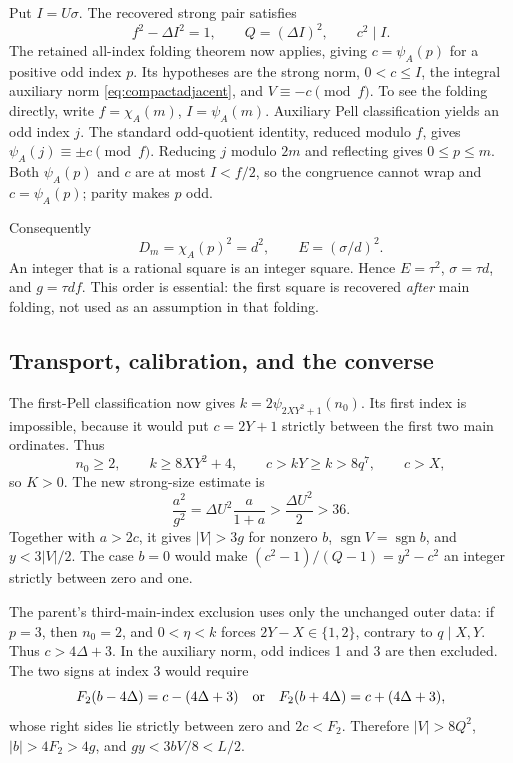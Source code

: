 Put \(I=U\sigma\). The recovered strong pair satisfies
\[
 f^2-\Delta I^2=1,\qquad Q=(\Delta I)^2,\qquad c^2\mid I.
\]
The retained all-index folding theorem now applies, giving
\(c=\psi_A(p)\) for a positive odd index \(p\). Its hypotheses are the
strong norm, \(0<c\le I\), the integral auxiliary norm
\eqref{eq:compactadjacent}, and \(V\equiv-c\pmod f\). To see the
folding directly, write \(f=\chi_A(m)\), \(I=\psi_A(m)\). Auxiliary
Pell classification yields an odd index \(j\). The standard odd-quotient
identity, reduced modulo \(f\), gives \(\psi_A(j)\equiv\pm c\pmod f\).
Reducing \(j\) modulo \(2m\) and reflecting gives \(0\le p\le m\).
Both \(\psi_A(p)\) and \(c\) are at most \(I<f/2\), so the congruence
cannot wrap and \(c=\psi_A(p)\); parity makes \(p\) odd.

Consequently
\[
 D_m=\chi_A(p)^2=d^2,\qquad E=(\sigma/d)^2.
\]
An integer that is a rational square is an integer square. Hence
\(E=\tau^2\), \(\sigma=\tau d\), and \(g=\tau df\).
This order is essential: the first square is recovered \emph{after}
main folding, not used as an assumption in that folding.

\subsection{Transport, calibration, and the converse}

The first-Pell classification now gives
\(k=2\psi_{2XY^2+1}(n_0)\). Its first index is impossible, because it
would put \(c=2Y+1\) strictly between the first two main ordinates.
Thus
\[
 n_0\ge2,\qquad k\ge8XY^2+4,\qquad c>kY\ge k>8q^7,
 \qquad c>X,
\]
so \(K>0\). The new strong-size estimate is
\[
 \frac{a^2}{g^2}=\Delta U^2\frac a{1+a}
   >\frac{\Delta U^2}{2}>36.
\]
Together with \(a>2c\), it gives \(|V|>3g\) for nonzero \(b\),
\(\operatorname{sgn}V=\operatorname{sgn}b\), and
\(y<3|V|/2\). The case \(b=0\) would make
\((c^2-1)/(Q-1)=y^2-c^2\) an integer strictly between zero and one.

The parent's third-main-index exclusion uses only the unchanged outer
data: if \(p=3\), then \(n_0=2\), and \(0<\eta<k\) forces
\(2Y-X\in\{1,2\}\), contrary to \(q\mid X,Y\). Thus
\(c>4\Delta+3\). In the auxiliary norm, odd indices 1 and 3 are then
excluded. The two signs at index 3 would require
\[
 F_2(b-4\Delta)=c-(4\Delta+3)
 \quad\hbox{or}\quad
 F_2(b+4\Delta)=c+(4\Delta+3),
\]
whose right sides lie strictly between zero and \(2c<F_2\).
Therefore \(|V|>8Q^2\), \(|b|>4F_2>4g\), and
\(gy<3bV/8<L/2\).

